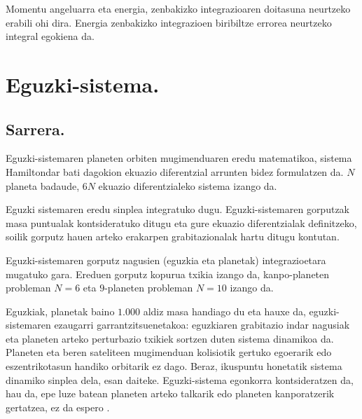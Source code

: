 Momentu angeluarra eta energia, zenbakizko integrazioaren doitasuna neurtzeko erabili ohi dira. Energia zenbakizko integrazioen biribiltze errorea neurtzeko integral egokiena da.

\section{Eguzki-sistema.}
\label{ss:34}

\subsection{Sarrera.}

Eguzki-sistemaren planeten orbiten mugimenduaren eredu matematikoa, sistema Hamiltondar bati dagokion ekuazio diferentzial arrunten bidez formulatzen da. $N$ planeta badaude, $6N$ ekuazio diferentzialeko sistema izango da.

Eguzki sistemaren eredu sinplea integratuko dugu. Eguzki-sistemaren gorputzak masa puntualak kontsideratuko ditugu eta gure ekuazio diferentzialak definitzeko, soilik gorputz hauen arteko erakarpen grabitazionalak hartu ditugu kontutan.

Eguzki-sistemaren gorputz nagusien (eguzkia eta planetak) integrazioetara mugatuko gara. Ereduen gorputz kopurua txikia izango da, kanpo-planeten probleman $N=6$ eta $9$-planeten probleman $N=10$ izango da.

Eguzkiak, planetak baino $1.000$ aldiz masa handiago du eta hauxe da, eguzki-sistemaren ezaugarri garrantzitsuenetakoa: eguzkiaren grabitazio indar nagusiak eta planeten arteko perturbazio txikiek sortzen duten sistema dinamikoa da. Planeten eta beren sateliteen mugimenduan kolisiotik gertuko egoerarik edo eszentrikotasun handiko orbitarik ez dago. Beraz, ikuspuntu honetatik sistema dinamiko sinplea dela, esan daiteke. Eguzki-sistema egonkorra kontsideratzen da, hau da, epe luze batean planeten arteko talkarik edo planeten kanporatzerik gertatzea, ez da espero  \cite{Laskar1999,Hayes2007}.

